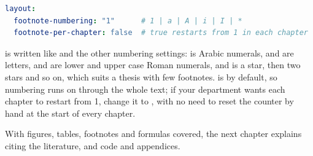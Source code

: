 \begin{lstlisting}[language=yaml]
layout:
  footnote-numbering: "1"      # 1 | a | A | i | I | *
  footnote-per-chapter: false  # true restarts from 1 in each chapter
\end{lstlisting}

 is written like  and the other numbering settings:  is Arabic numerals,  and  are letters,  and  are lower and upper case Roman numerals, and  is a star, then two stars and so on, which suits a thesis with few footnotes.  is  by default, so numbering runs on through the whole text; if your department wants each chapter to restart from 1, change it to , with no need to reset the counter by hand at the start of every chapter.

With figures, tables, footnotes and formulas covered, the next chapter explains citing the literature, and code and appendices.
